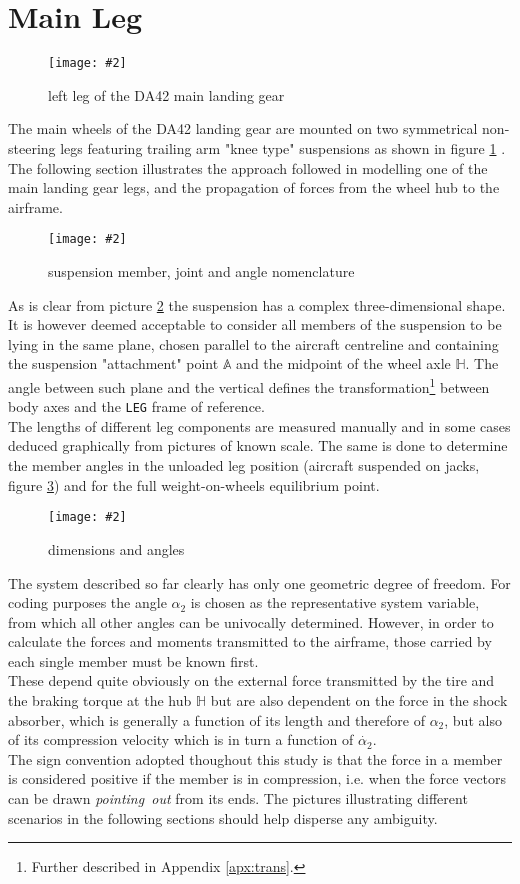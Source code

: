 \documentclass[12pt,a4paper]{report}
\newcommand{\figura}[5][htbp]{
\begin{figure}[#1]
\begin{center}
\texttt{[image: \#2]}
\caption{#4}\label{#5}
\end{center}
\end{figure}
}
\begin{document}
\section{Main Leg}
\figura{main_lgear.png}{width=14cm}{left leg of the DA42 main landing gear }{fig:mainreal}
The main wheels of the DA42 landing gear are mounted on two symmetrical non-steering legs featuring trailing arm "knee type" suspensions as shown in figure \ref{fig:mainreal} \citep{DA42mtnc}. 
The following section illustrates the approach followed in modelling one of the main landing gear legs, and the propagation of forces from the wheel hub to the airframe.
\figura{piczero.jpg}{width=5cm}{suspension member, joint and angle nomenclature}{fig:maincolors}
As is clear from picture \ref{fig:maincolors} the suspension has a complex three-dimensional shape. It is however deemed acceptable to consider all members of the suspension to be lying in the same plane, chosen parallel to the aircraft centreline and containing the suspension "attachment" point $\mathds{A}$ and the midpoint of the wheel axle $\mathds{H}$. The angle between such plane and the vertical defines the transformation\footnote{Further described in Appendix \ref{apx:trans}.} between body axes and the \texttt{LEG} frame of reference.\\ 
The lengths of different leg components are measured manually and in some cases deduced graphically from pictures of known scale. The same is done to determine the member angles in the unloaded leg position (aircraft suspended on jacks, figure \ref{fig:mainsize}) and for the full weight-on-wheels equilibrium point.
\figura{piczero.jpg}{width=5cm}{dimensions and angles}{fig:mainsize}
The system described so far clearly has only one geometric degree of freedom. For coding purposes the angle $\alpha_2$ is chosen as the representative system variable, from which all other angles can be univocally determined. 
However, in order to calculate the forces and moments transmitted to the airframe, those carried by each single member must be known first.\\ These depend quite obviously on the external force transmitted by the tire and the braking torque at the hub $\mathds{H}$ but are also dependent on the force in the shock absorber, which is generally a function of its length and therefore of $\alpha_2$, but also of its compression velocity which is in turn a function of $\dot{\alpha_2}$.\\



The sign convention adopted thoughout this study is that the force in a member is considered positive if the member is in compression, i.e. when the force vectors can be drawn \emph{pointing~out} from its ends. The pictures illustrating different scenarios in the following sections should help disperse any ambiguity.
\end{document}
